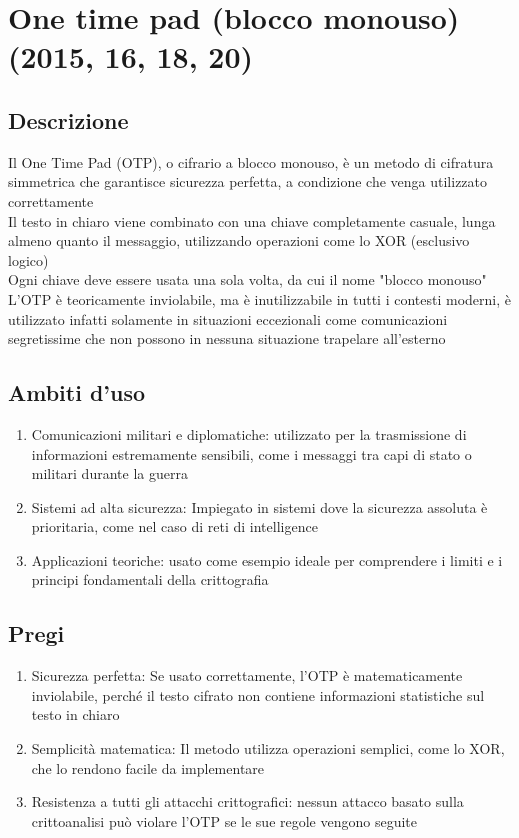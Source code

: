 \documentclass[10pt,oneside,a4paper]{article}
\begin{document}
\section{One time pad (blocco monouso) (2015, 16, 18, 20)}
\subsection{Descrizione}
Il One Time Pad (OTP), o cifrario a blocco monouso, è un metodo di cifratura simmetrica che garantisce sicurezza perfetta, a condizione che venga utilizzato correttamente\\
Il testo in chiaro viene combinato con una chiave completamente casuale, lunga almeno quanto il messaggio, utilizzando operazioni come lo XOR (esclusivo logico)\\
Ogni chiave deve essere usata una sola volta, da cui il nome "blocco monouso"\\  
L'OTP è teoricamente inviolabile, ma è inutilizzabile in tutti i contesti moderni, è utilizzato infatti solamente in situazioni eccezionali come comunicazioni segretissime che non possono in nessuna situazione trapelare all'esterno
\subsection{Ambiti d'uso}
\begin{enumerate}
\item Comunicazioni militari e diplomatiche: utilizzato per la trasmissione di informazioni estremamente sensibili, come i messaggi tra capi di stato o militari durante la guerra
\item Sistemi ad alta sicurezza: Impiegato in sistemi dove la sicurezza assoluta è prioritaria, come nel caso di reti di intelligence
\item Applicazioni teoriche: usato come esempio ideale per comprendere i limiti e i principi fondamentali della crittografia
\end{enumerate}
\subsection{Pregi}
\begin{enumerate}
\item Sicurezza perfetta: Se usato correttamente, l'OTP è matematicamente inviolabile, perché il testo cifrato non contiene informazioni statistiche sul testo in chiaro
\item Semplicità matematica: Il metodo utilizza operazioni semplici, come lo XOR, che lo rendono facile da implementare
\item Resistenza a tutti gli attacchi crittografici: nessun attacco basato sulla crittoanalisi può violare l'OTP se le sue regole vengono seguite
\end{enumerate}
\end{document}
